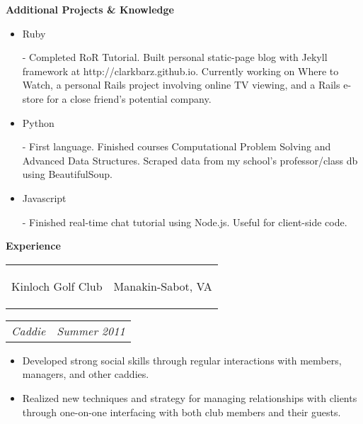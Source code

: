 \documentclass[11pt]{article}
\makeatletter
\newcommand{\headerrow}[2]
{\begin{tabular*}{\linewidth}{l@{\extracolsep{\fill}}r}
	#1 &
	#2 \\
\end{tabular*}}
\makeatother
\begin{document}
\vspace{-0.3em}

\begin{LARGE}
	\bf Additional Projects \& Knowledge
\end{LARGE}

\vspace{-0.5em}

\begin{itemize}
	\item \begin{bf}Ruby\end{bf} - Completed RoR Tutorial. Built personal static-page blog with Jekyll framework at http://clarkbarz.github.io. Currently working on Where to Watch, a personal Rails project involving online TV viewing, and a Rails e-store for a close friend's potential company.
	\vspace{-0.5em}
	\item \begin{bf}Python\end{bf} - First language. Finished courses Computational Problem Solving and Advanced Data Structures. Scraped data from my school's professor/class db using BeautifulSoup.
	\vspace{-0.5em}
	\item \begin{bf}Javascript\end{bf} - Finished real-time chat tutorial using Node.js. Useful for client-side code.
\end{itemize}

\vspace{-0.5em}
\begin{LARGE}
	\bf Experience
\end{LARGE}

\vspace{0.5em}

\headerrow
	{\begin{Large}Kinloch Golf Club\end{Large}}
	{Manakin-Sabot, VA}
\headerrow
	{\textit{Caddie}}
	{\textit{Summer 2011}}
	
\vspace{-0.8em}
\begin{itemize}
	\item Developed strong social skills through regular interactions with members, managers, and other caddies.
	\vspace{-0.5em}
	\item Realized new techniques and strategy for managing relationships with clients through one-on-one interfacing with both club members and their guests. 
\end{itemize}
\end{document}
